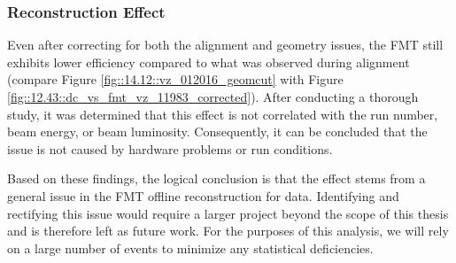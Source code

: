 \subsubsection{Reconstruction Effect}
\label{14.13::reconstruction_effect}
    Even after correcting for both the alignment and geometry issues, the FMT still exhibits lower efficiency compared to what was observed during alignment (compare Figure \ref{fig::14.12::vz_012016_geomcut} with Figure \ref{fig::12.43::dc_vs_fmt_vz_11983_corrected}).
    After conducting a thorough study, it was determined that this effect is not correlated with the run number, beam energy, or beam luminosity.
    Consequently, it can be concluded that the issue is not caused by hardware problems or run conditions.

    Based on these findings, the logical conclusion is that the effect stems from a general issue in the FMT offline reconstruction for data.
    Identifying and rectifying this issue would require a larger project beyond the scope of this thesis and is therefore left as future work.
    For the purposes of this analysis, we will rely on a large number of events to minimize any statistical deficiencies.
